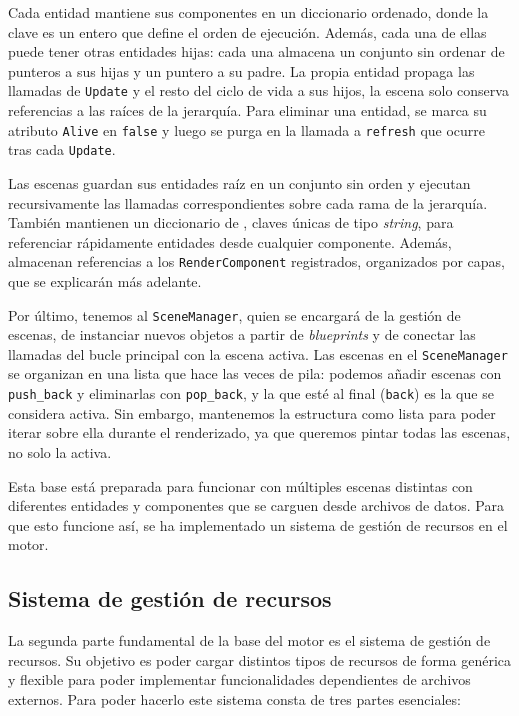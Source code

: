 \medskip

Cada entidad mantiene sus componentes en un diccionario ordenado, donde la clave es un entero que define el orden de ejecución. Además, cada una de ellas puede tener otras entidades hijas: cada una almacena un conjunto sin ordenar de punteros a sus hijas y un puntero a su padre. La propia entidad propaga las llamadas de \texttt{Update} y el resto del ciclo de vida a sus hijos, la escena solo conserva referencias a las raíces de la jerarquía. Para eliminar una entidad, se marca su atributo \texttt{Alive} en \texttt{false} y luego se purga en la llamada a \texttt{refresh} que ocurre tras cada \texttt{Update}.

\medskip

Las escenas guardan sus entidades raíz en un conjunto sin orden y ejecutan recursivamente las llamadas correspondientes sobre cada rama de la jerarquía. También mantienen un diccionario de , claves únicas de tipo \textit{string}, para referenciar rápidamente entidades desde cualquier componente. Además, almacenan referencias a los \texttt{RenderComponent} registrados, organizados por capas, que se explicarán más adelante. 

\medskip

Por último, tenemos al \texttt{SceneManager}, quien se encargará de la gestión de escenas, de instanciar nuevos objetos a partir de \textit{blueprints} y de conectar las llamadas del bucle principal con la escena activa. Las escenas en el \texttt{SceneManager} se organizan en una lista que hace las veces de pila: podemos añadir escenas con \texttt{push\_back} y eliminarlas con \texttt{pop\_back}, y la que esté al final (\texttt{back}) es la que se considera activa. Sin embargo, mantenemos la estructura como lista para poder iterar sobre ella durante el renderizado, ya que queremos pintar todas las escenas, no solo la activa.

\medskip

Esta base está preparada para funcionar con múltiples escenas distintas con diferentes entidades y componentes que se carguen desde archivos de datos. Para que esto funcione así, se ha implementado un sistema de gestión de recursos en el motor.

\subsection{Sistema de gestión de recursos}
La segunda parte fundamental de la base del motor es el sistema de gestión de recursos. Su objetivo es poder cargar distintos tipos de recursos de forma genérica y flexible para poder implementar funcionalidades dependientes de archivos externos. Para poder hacerlo este sistema consta de tres partes esenciales: 

